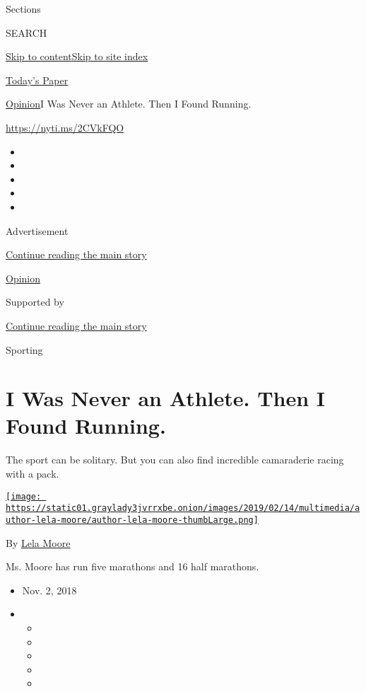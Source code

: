 Sections

SEARCH

\protect\hyperlink{site-content}{Skip to
content}\protect\hyperlink{site-index}{Skip to site index}

\href{https://myaccount.nytimes3xbfgragh.onion/auth/login?response_type=cookie\&client_id=vi}{}

\href{https://www.nytimes3xbfgragh.onion/section/todayspaper}{Today's
Paper}

\href{/section/opinion}{Opinion}\textbar{}I Was Never an Athlete. Then I
Found Running.

\url{https://nyti.ms/2CVkFQO}

\begin{itemize}
\item
\item
\item
\item
\item
\end{itemize}

Advertisement

\protect\hyperlink{after-top}{Continue reading the main story}

\href{/section/opinion}{Opinion}

Supported by

\protect\hyperlink{after-sponsor}{Continue reading the main story}

Sporting

\hypertarget{i-was-never-an-athlete-then-i-found-running}{%
\section{I Was Never an Athlete. Then I Found
Running.}\label{i-was-never-an-athlete-then-i-found-running}}

The sport can be solitary. But you can also find incredible camaraderie
racing with a pack.

\href{https://www.nytimes3xbfgragh.onion/by/lela-moore}{\texttt{[image: https://static01.graylady3jvrrxbe.onion/images/2019/02/14/multimedia/author-lela-moore/author-lela-moore-thumbLarge.png]}}

By \href{https://www.nytimes3xbfgragh.onion/by/lela-moore}{Lela Moore}

Ms. Moore has run five marathons and 16 half marathons.

\begin{itemize}
\item
  Nov. 2, 2018
\item
  \begin{itemize}
  \item
  \item
  \item
  \item
  \item
  \end{itemize}
\end{itemize}

